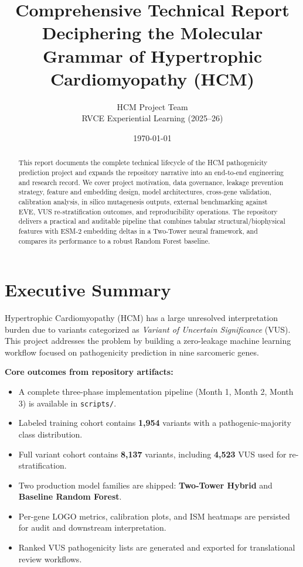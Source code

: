 \documentclass[11pt,a4paper]{article}
\title{\textbf{Comprehensive Technical Report}\\
\large Deciphering the Molecular Grammar of Hypertrophic Cardiomyopathy (HCM)}
\author{HCM Project Team \\ RVCE Experiential Learning (2025--26)}
\date{\today}
\begin{document}
\maketitle
\thispagestyle{empty}

\begin{abstract}
This report documents the complete technical lifecycle of the HCM pathogenicity prediction project and expands the repository narrative into an end-to-end engineering and research record. We cover project motivation, data governance, leakage prevention strategy, feature and embedding design, model architectures, cross-gene validation, calibration analysis, in silico mutagenesis outputs, external benchmarking against EVE, VUS re-stratification outcomes, and reproducibility operations. The repository delivers a practical and auditable pipeline that combines tabular structural/biophysical features with ESM-2 embedding deltas in a Two-Tower neural framework, and compares its performance to a robust Random Forest baseline.
\end{abstract}

\newpage
\tableofcontents
\newpage

\section{Executive Summary}
Hypertrophic Cardiomyopathy (HCM) has a large unresolved interpretation burden due to variants categorized as \textit{Variant of Uncertain Significance} (VUS). This project addresses the problem by building a zero-leakage machine learning workflow focused on pathogenicity prediction in nine sarcomeric genes.

\textbf{Core outcomes from repository artifacts:}
\begin{itemize}[leftmargin=1.2cm]
    \item A complete three-phase implementation pipeline (Month 1, Month 2, Month 3) is available in \texttt{scripts/}.
    \item Labeled training cohort contains \textbf{1,954} variants with a pathogenic-majority class distribution.
    \item Full variant cohort contains \textbf{8,137} variants, including \textbf{4,523} VUS used for re-stratification.
    \item Two production model families are shipped: \textbf{Two-Tower Hybrid} and \textbf{Baseline Random Forest}.
    \item Per-gene LOGO metrics, calibration plots, and ISM heatmaps are persisted for audit and downstream interpretation.
    \item Ranked VUS pathogenicity lists are generated and exported for translational review workflows.
\end{itemize}
\end{document}
